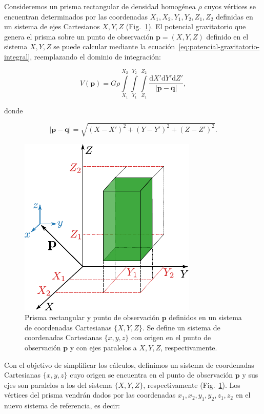 Consideremos un prisma rectangular de densidad homogénea $\rho$ cuyos vértices
se encuentran determinados por las coordenadas $X_1, X_2, Y_1, Y_2, Z_1, Z_2$
definidas en un sistema de ejes Cartesianos ${X, Y, Z}$
(Fig.~\ref{fig:rectangular-prism}).
El potencial gravitatorio que genera el prisma sobre un punto de observación
$\mathbf{p} = (X, Y, Z)$ definido en el sistema ${X, Y, Z}$ se puede
calcular mediante la ecuación~\ref{eq:potencial-gravitatorio-integral},
reemplazando el dominio de integración:

\begin{equation}
    V(\mathbf{p}) =
    G \rho
    \int\limits_{X_1}^{X_2}
    \int\limits_{Y_1}^{Y_2}
    \int\limits_{Z_1}^{Z_2}
    \frac{\text{d}X' \text{d}Y' \text{d}Z'}{|\mathbf{p} - \mathbf{q}|},
\end{equation}

\noindent donde

\begin{equation}
    |\mathbf{p} - \mathbf{q}| = \sqrt{
        (X - X')^2 + (Y - Y')^2 + (Z - Z')^2
    }.
\end{equation}

\begin{figure}
    \centering
    \includegraphics[width=0.6\linewidth]{figs/rectangular-prism.pdf}
    \caption{
        Prisma rectangular y punto de observación $\mathbf{p}$ definidos en un
        sistema de coordenadas Cartesianas $\{X, Y, Z\}$. Se define un sistema
        de coordenadas Cartesianas $\{x, y, z\}$ con origen en el punto de
        observación $\mathbf{p}$ y con ejes paralelos a $X, Y, Z$,
        respectivamente.
    }
    \label{fig:rectangular-prism}
\end{figure}

Con el objetivo de simplificar los cálculos, definimos un sistema de
coordenadas Cartesianas $\{x, y, z\}$ cuyo origen se encuentra en el punto de
observación $\mathbf{p}$ y sus ejes son paralelos a los del sistema $\{X, Y,
Z\}$, respectivamente (Fig.~\ref{fig:rectangular-prism}).
Los vértices del prisma vendrán dados por las coordenadas
$x_1, x_2, y_1, y_2, z_1, z_2$ en el nuevo sistema de referencia, es decir:

